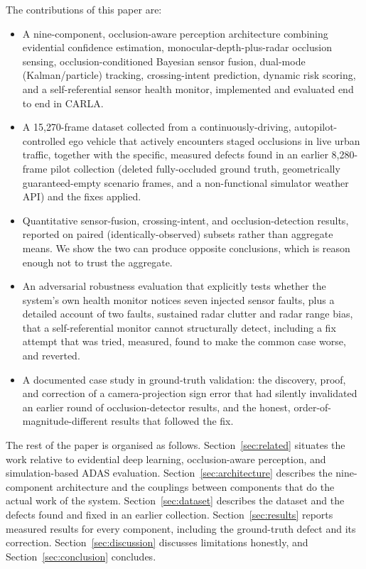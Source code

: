 \documentclass[conference]{IEEEtran}
\begin{document}
The contributions of this paper are:
\begin{itemize}
\item A nine-component, occlusion-aware perception architecture
  combining evidential confidence estimation, monocular-depth-plus-radar
  occlusion sensing, occlusion-conditioned Bayesian sensor fusion,
  dual-mode (Kalman/particle) tracking, crossing-intent prediction,
  dynamic risk scoring, and a self-referential sensor health monitor,
  implemented and evaluated end to end in CARLA.
\item A 15{,}270-frame dataset collected from a continuously-driving,
  autopilot-controlled ego vehicle that actively encounters staged
  occlusions in live urban traffic, together with the specific,
  measured defects found in an earlier 8{,}280-frame pilot collection
  (deleted fully-occluded ground truth, geometrically guaranteed-empty
  scenario frames, and a non-functional simulator weather API) and the
  fixes applied.
\item Quantitative sensor-fusion, crossing-intent, and occlusion-detection
  results, reported on paired (identically-observed) subsets rather
  than aggregate means. We show the two can produce opposite
  conclusions, which is reason enough not to trust the aggregate.
\item An adversarial robustness evaluation that explicitly tests
  whether the system's own health monitor notices seven injected
  sensor faults, plus a detailed account of two faults, sustained
  radar clutter and radar range bias, that a self-referential monitor
  cannot structurally detect, including a fix attempt that was tried,
  measured, found to make the common case worse, and reverted.
\item A documented case study in ground-truth validation: the
  discovery, proof, and correction of a camera-projection sign error
  that had silently invalidated an earlier round of occlusion-detector
  results, and the honest, order-of-magnitude-different results that
  followed the fix.
\end{itemize}

The rest of the paper is organised as follows. Section~\ref{sec:related}
situates the work relative to evidential deep learning, occlusion-aware
perception, and simulation-based ADAS evaluation. Section~\ref{sec:architecture}
describes the nine-component architecture and the couplings between
components that do the actual work of the system. Section~\ref{sec:dataset}
describes the dataset and the defects found and fixed in an earlier
collection. Section~\ref{sec:results} reports measured results for every
component, including the ground-truth defect and its correction.
Section~\ref{sec:discussion} discusses limitations honestly, and
Section~\ref{sec:conclusion} concludes.
\end{document}
